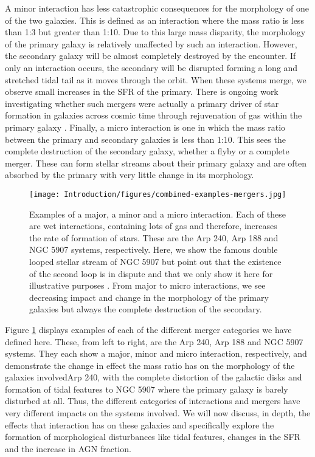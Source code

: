 A minor interaction has less catastrophic consequences for the morphology of one of the two galaxies. This is defined as an interaction where the mass ratio is less than 1:3 but greater than 1:10. Due to this large mass disparity, the morphology of the primary galaxy is relatively unaffected by such an interaction. However, the secondary galaxy will be almost completely destroyed by the encounter. If only an interaction occurs, the secondary will be \DIFdelbegin {}\DIFdelend \DIFaddbegin {}\DIFaddend disrupted forming a long and stretched tidal tail as it moves through the orbit. When these systems merge, we observe small increases in the SFR of the primary. There is ongoing work investigating whether such mergers were actually a primary driver of star formation in galaxies across cosmic time through rejuvenation of gas \DIFdelbegin {}\DIFdelend \DIFaddbegin {}\DIFaddend within the primary galaxy \citep{2007A&A...476.1179B, 2014MNRAS.440.2944K, 2022MNRAS.511..607J}. Finally, a micro interaction is one in which the mass ratio between the primary and secondary galaxies is less than 1:10. This sees the complete destruction of the secondary galaxy, whether a flyby or a complete merger. These can form stellar streams about their primary galaxy and are often absorbed by the primary with very little change in its morphology.

\begin{figure}
\centering
\texttt{[image: Introduction/figures/combined-examples-mergers.jpg]}
\caption[Examples of a major, a minor and a micro interaction.]{Examples of a major, a minor and a micro interaction. Each of these are wet interactions, containing lots of gas and therefore, increases the rate of formation of stars. These are the Arp 240, Arp 188 and NGC 5907 systems, respectively. Here, we show the famous double looped stellar stream of NGC 5907 but point out that the existence of the second loop is in dispute and that we only show it here for illustrative purposes \citep{2019ApJ...883L..32V}. From major to micro interactions, we see decreasing impact and change in the morphology of the primary galaxies but always the complete destruction of the secondary.}
\label{fig:merger-clsfs}
\end{figure}

Figure \ref{fig:merger-clsfs} displays examples of each of the different merger categories we have defined here. These, from left to right, are the Arp 240, Arp 188 and NGC 5907 systems. They each show a major, minor and micro interaction, respectively, and demonstrate the change in effect the mass ratio has on the morphology of the galaxies involved\DIFdelbegin {}\DIFdelend \DIFaddbegin {}\DIFaddend Arp 240, with the complete distortion of the galactic disks and formation of tidal features to NGC 5907 where the primary galaxy is barely disturbed at all. Thus, the different categories of interactions and mergers have very different impacts on the systems involved. We will now discuss, in depth, the effects that interaction has on these galaxies and specifically explore the formation of morphological disturbances like tidal features, changes in the SFR and the increase in AGN fraction.

